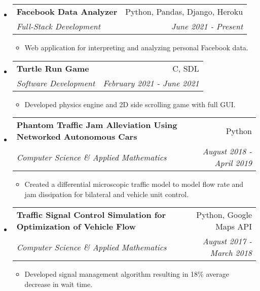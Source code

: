 \documentclass[letterpaper,11pt]{article}
\makeatletter
\newcommand{\resitem}[1]{\item #1 \vspace{-3pt}}
\newcommand{\ressubheading}[4]{
	\begin{tabular*}{7.0in}{l@{\extracolsep{\fill}}r}
			\textbf{#1} & #2 \\
			\textit{#3} & \textit{#4}
	\end{tabular*}\vspace{-6pt}
}
\makeatother
\begin{document}
\begin{itemize}[leftmargin=*]
	\item 
		\ressubheading{Facebook Data Analyzer}{Python, Pandas, Django, Heroku}{Full-Stack Development}{June 2021 - Present}
			\begin{itemize}[leftmargin=*]
				\resitem{Web application for interpreting and analyzing personal Facebook data.}
			\end{itemize}
	
	\item 
		\ressubheading{Turtle Run Game}{C, SDL}{Software Development}{February 2021 - June 2021}
			\begin{itemize}[leftmargin=*]
				\item Developed physics engine and 2D side scrolling game with full GUI.
			\end{itemize}
	\item
		\ressubheading{Phantom Traffic Jam Alleviation Using Networked Autonomous Cars}{Python}{Computer Science \& Applied Mathematics}{August 2018 - April 2019}
			\begin{itemize}[leftmargin=*]
				\resitem{Created a differential microscopic traffic model to model flow rate and jam dissipation for bilateral and vehicle unit control.}
			\end{itemize}
	
	\item
		\ressubheading{Traffic Signal Control Simulation for Optimization of Vehicle Flow}{Python, Google Maps API}{Computer Science \& Applied Mathematics}{August 2017 - March 2018}
			\begin{itemize}[leftmargin=*]
				\resitem{Developed signal management algorithm resulting in 18\% average decrease in wait time.}
			\end{itemize}



\end{itemize}
\end{document}
